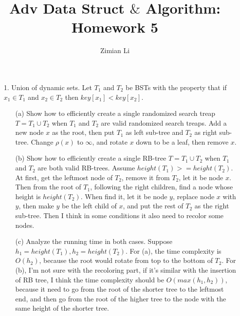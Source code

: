 \documentclass{article}       %
\title{Adv Data Struct $\&$ Algorithm: Homework 5}
\author{Zimian Li}
\begin{document}
        
\maketitle
\begin{enumerate}
	\item[1.]Union of dynamic sets. Let $T_1$ and $T_2$ be BSTs with the property that if $x_1 \in T_1$ and $x_2 \in T_2$ then $key[x_1] < key[x_2]$.
	\begin{enumerate}
		\item[(a)] Show how to efficiently create a single randomized search treap $T = T_1 \cup T_2$ when $T_1$ and $T_2$ are valid randomized search treaps.\newline\newline
		Add a new node $x$ as the root, then put $T_1$ as left sub-tree and $T_2$ as right sub-tree. Change $\rho (x)$ to $\infty$, and rotate $x$ down to be a leaf, then remove $x$.\newline
		\item[(b)] Show how to efficiently create a single RB-tree $T = T_1 \cup T_2$ when $T_1$ and $T_2$ are both valid RB-trees.\newline\newline
		Assume $height(T_1) >= height(T_2)$.\newline
		At first, get the leftmost node of $T_2$, remove it from $T_2$, let it be node $x$. Then from the root of $T_1$, following the right children, find a node whose height is $height(T_2)$. When find it, let it be node $y$, replace node $x$ with $y$, then make $y$ be the left child of $x$, and put the rest of $T_2$ as the right sub-tree. Then I think in some conditions it also need to recolor some nodes.\newline
		\item[(c)] Analyze the running time in both cases.\newline\newline
		Suppose $h_1 = height(T_1), h_2 = height(T_2)$.\newline
		For (a), the time complexity is $O(h_2)$, because the root would rotate from top to the bottom of $T_2$.\newline
		For (b), I'm not sure with the recoloring part, if it's similar with the insertion of RB tree, I think the time complexity should be $O(max(h_1, h_2))$, because it need to go from the root of the shorter tree to the leftmost end, and then go from the root of the higher tree to the node with the same height of the shorter tree.\newline

\end{enumerate}
\end{enumerate}
\end{document}
